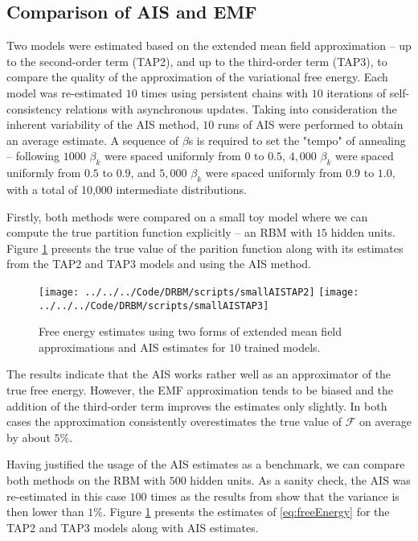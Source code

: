 \subsection{Comparison of AIS and EMF}
Two models were estimated based on the extended mean field approximation -- up to the second-order term (TAP2), and up to the third-order term (TAP3), to compare the quality of the approximation of the variational free energy.
Each model was re-estimated $10$ times using persistent chains with $10$ iterations of self-consistency relations with asynchronous updates. Taking into consideration the inherent variability of the AIS method, $10$ runs of AIS were performed to obtain an average estimate.  A sequence of $\beta$s is required to set the "tempo" of annealing -- following \cite{salakhutdinov2008learning} $1000$ $\beta_k$ were spaced uniformly from  $0 $ to  $0.5$, $4,000$ $\beta_k$ were spaced uniformly from $0.5$ to $0.9$, and $5,000$ $\beta_k$ were spaced uniformly from $0.9$ to $1.0$, with a total of 10,000 intermediate distributions. 

Firstly, both methods were compared on a small toy model where we can compute the true partition function explicitly -- an RBM with $15$ hidden units. Figure \ref{fig:AISTAP2small} presents the true value of the parition function along with its estimates from the TAP2 and TAP3 models and using the AIS method.

\begin{figure}[!htb]
%
 \texttt{[image: ../../../Code/DRBM/scripts/smallAISTAP2]}
\endminipage 
{}  
\texttt{[image: ../../../Code/DRBM/scripts/smallAISTAP3]}
\endminipage\hfill
  \caption[Comparison of AIS and EMF on toy RBM]{Free energy estimates using two forms of extended mean field approximations and AIS estimates for $10$ trained models.}
  \label{fig:AISTAP2small}
\end{figure}

The results indicate that the AIS works rather well as an approximator of the true free energy. However, the EMF approximation tends to be biased and the addition of the third-order term improves the estimates only slightly. In both cases the approximation consistently overestimates the true value of $\mathcal{F}$ on average by about $5\%$. 

Having justified the usage of the AIS estimates as a benchmark, we can compare both methods on the RBM with $500$ hidden units. As a sanity check, the AIS was re-estimated in this case $100$ times as the results from \cite{salakhutdinov2008learning} show that the variance is then lower than $1\%$. Figure \ref{fig:AISTAP2small} presents the estimates of \ref{eq:freeEnergy} for the TAP2 and TAP3 models along with AIS estimates.

